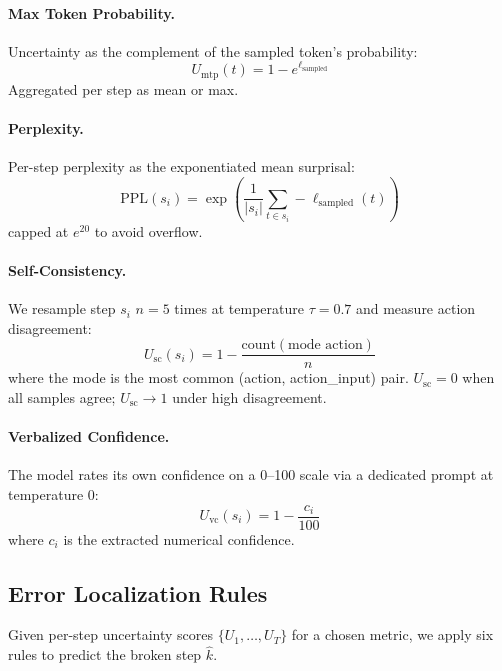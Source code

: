 \documentclass[letterpaper]{article}
\begin{document}
\paragraph{Max Token Probability.} Uncertainty as the complement of the sampled token's probability:
\begin{equation}
  U_\text{mtp}(t) = 1 - e^{\ell_{\text{sampled}}}
\end{equation}
Aggregated per step as mean or max.

\paragraph{Perplexity.} Per-step perplexity as the exponentiated mean surprisal:
\begin{equation}
  \text{PPL}(s_i) = \exp\!\left(\frac{1}{|s_i|}\sum_{t \in s_i} -\ell_{\text{sampled}}(t)\right)
\end{equation}
capped at $e^{20}$ to avoid overflow.

\paragraph{Self-Consistency.} We resample step $s_i$ $n=5$ times at temperature $\tau = 0.7$ and measure action disagreement:
\begin{equation}
  U_\text{sc}(s_i) = 1 - \frac{\text{count}(\text{mode action})}{n}
\end{equation}
where the mode is the most common (action, action\_input) pair. $U_\text{sc} = 0$ when all samples agree; $U_\text{sc} \to 1$ under high disagreement.

\paragraph{Verbalized Confidence.} The model rates its own confidence on a 0--100 scale via a dedicated prompt at temperature 0:
\begin{equation}
  U_\text{vc}(s_i) = 1 - \frac{c_i}{100}
\end{equation}
where $c_i$ is the extracted numerical confidence.

\subsection{Error Localization Rules}

Given per-step uncertainty scores $\{U_1, \ldots, U_T\}$ for a chosen metric, we apply six rules to predict the broken step $\hat{k}$.
\end{document}
